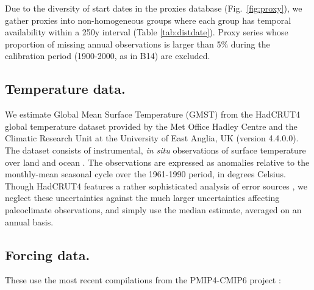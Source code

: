 \documentclass[12pt]{amsart}
\theoremstyle{plain}
\theoremstyle{definition}
\theoremstyle{remark}
\newcommand{\lb}[1]{\color{MidnightBlue}\textbf{[LB: #1]}\normalcolor}
\newcommand{\jeg}[1]{\color{ProcessBlue}\textbf{[JEG: #1]}\normalcolor}
\begin{document}
\vskip -0.7cm

Due to the diversity of start dates in the proxies database (Fig.~\ref{fig:proxy}), we gather proxies into non-homogeneous groups where each group has temporal availability within a 250y interval (Table \ref{tab:distdate}).  Proxy series whose proportion of missing annual observations is larger than 5\% during the calibration period (1900-2000, as in  B14) are excluded.  %


\subsection{Temperature data.}
We estimate Global Mean Surface Temperature (GMST) from the HadCRUT4 global temperature dataset provided by the Met Office Hadley
Centre and the Climatic Research Unit at the University of East Anglia, UK
(version 4.4.0.0). The dataset consists of instrumental, {\it in situ}
observations of surface temperature over land \citep{Jones2012} and ocean
\citep{Kennedy2011a,Kennedy2011}. The
observations are expressed as anomalies relative to the monthly-mean seasonal cycle over the 1961-1990 period, in degrees Celsius. Though HadCRUT4 features a rather sophisticated analysis of error sources \citep{Morice2012}, we neglect these uncertainties against the much larger uncertainties affecting paleoclimate observations, and simply use the median estimate, averaged on an annual basis.


\subsection{Forcing data.}
These use the most recent compilations from the PMIP4-CMIP6 project \citep{JungclausGMD17}: 
\end{document}
